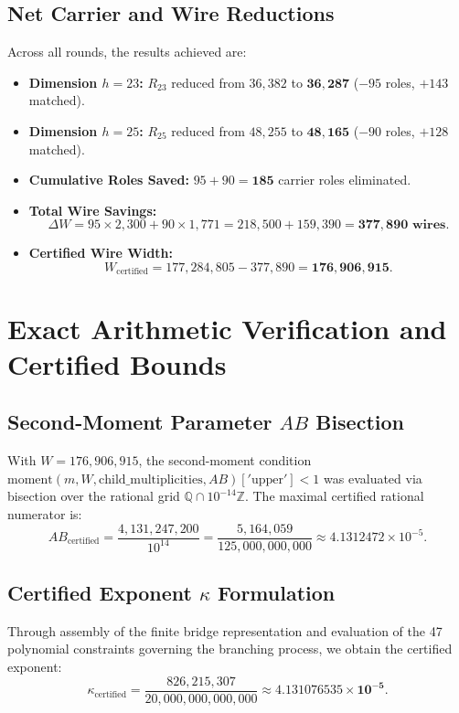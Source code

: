 \documentclass[11pt,a4paper]{article}
\begin{document}
\subsection{Net Carrier and Wire Reductions}
Across all rounds, the results achieved are:
\begin{itemize}
    \item \textbf{Dimension $h=23$:} $R_{23}$ reduced from $36,382$ to $\mathbf{36,287}$ ($-95$ roles, $+143$ matched).
    \item \textbf{Dimension $h=25$:} $R_{25}$ reduced from $48,255$ to $\mathbf{48,165}$ ($-90$ roles, $+128$ matched).
    \item \textbf{Cumulative Roles Saved:} $95 + 90 = \mathbf{185}$ carrier roles eliminated.
    \item \textbf{Total Wire Savings:}
    \[
    \Delta W = 95 \times 2,300 + 90 \times 1,771 = 218,500 + 159,390 = \mathbf{377,890\text{ wires}}.
    \]
    \item \textbf{Certified Wire Width:}
    \[
    W_{\text{certified}} = 177,284,805 - 377,890 = \mathbf{176,906,915}.
    \]
\end{itemize}

\section{Exact Arithmetic Verification and Certified Bounds}

\subsection{\texorpdfstring{Second-Moment Parameter $AB$ Bisection}{Second-Moment Parameter AB Bisection}}
With $W = 176,906,915$, the second-moment condition $\text{moment}(m, W, \text{child\_multiplicities}, AB)['\text{upper}'] < 1$ was evaluated via bisection over the rational grid $\mathbb{Q} \cap 10^{-14} \mathbb{Z}$. The maximal certified rational numerator is:
\begin{equation}
AB_{\text{certified}} = \frac{4,131,247,200}{10^{14}} = \frac{5,164,059}{125,000,000,000} \approx 4.1312472 \times 10^{-5}.
\end{equation}

\subsection{\texorpdfstring{Certified Exponent $\kappa$ Formulation}{Certified Exponent kappa Formulation}}
Through assembly of the finite bridge representation and evaluation of the 47 polynomial constraints governing the branching process, we obtain the certified exponent:
\begin{equation}
\kappa_{\text{certified}} = \frac{826,215,307}{20,000,000,000,000} \approx \mathbf{4.131076535 \times 10^{-5}}.
\end{equation}
\end{document}
